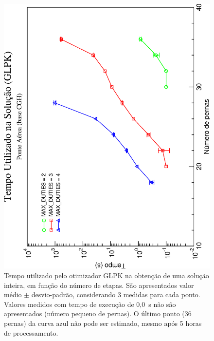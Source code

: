 \documentclass[12pt,a4paper]{article}
\begin{document}
\begin{figure}[htb]
	\begin{center}
		\includegraphics[scale=0.45,angle=-90]{fig/glpk_solution_time.eps}
		\caption{Tempo utilizado pelo otimizador GLPK na obtenção de uma solução inteira, em função do 
		número de etapas. São apresentados valor médio $\pm$ desvio-padrão, considerando 3 medidas para 
		cada ponto. Valores medidos com tempo de execução de 0,0~s não são apresentados (número pequeno 
		de pernas). O último ponto (36 pernas) da curva azul não pode ser estimado, mesmo após 5 horas 
		de processamento.}
		\label{fig:glpk}
	\end{center}
\end{figure}
\end{document}
